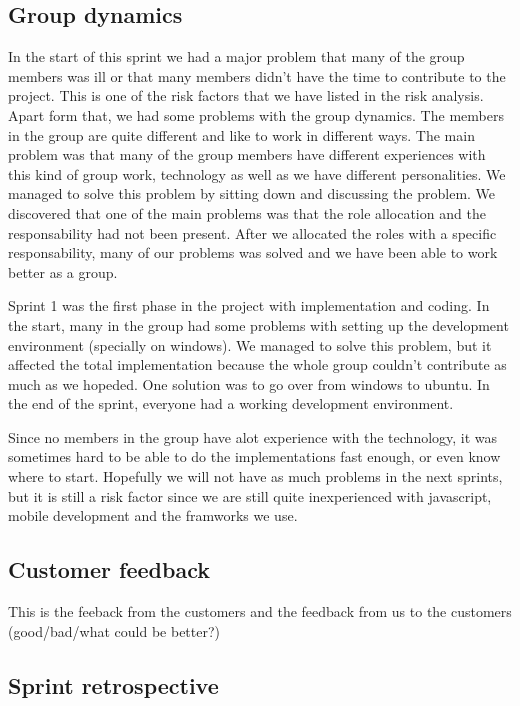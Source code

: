 \subsection{Group dynamics}
In the start of this sprint we had a major problem that many of the group members was ill or 
that many members didn't have the time to contribute to the project. This is one of the risk factors 
that we have listed in the risk analysis. 
Apart form that, we had some problems with the group dynamics. The members in the group are 
quite different and like to work in different ways. The main problem was that many of the group members
have different experiences with this kind of group work, technology as well as we have 
different personalities.
We managed to solve this problem by sitting down and discussing the problem. We discovered that
one of the main problems was that the role allocation and the responsability had not been present.
After we allocated the roles with a specific responsability, many of our problems was solved and
we have been able to work better as a group.

Sprint 1 was the first phase in the project with implementation and coding. In the start, many in the group had
some problems with setting up the development environment (specially on windows). We managed
to solve this problem, but it affected the total implementation because the whole group couldn't 
contribute as much as we hopeded. One solution was to go over from windows to ubuntu. 
In the end of the sprint, everyone had a working development environment.

Since no members in the group have alot experience with the technology, it was sometimes hard
to be able to do the implementations fast enough, or even know where to start. 
Hopefully we will not have as much problems in the next sprints, but it is still a risk factor 
since we are still quite inexperienced with javascript, mobile development and the framworks we use. 

\subsection{Customer feedback}
	This is the feeback from the customers and the feedback from us to the customers (good/bad/what could be better?)

\subsection{Sprint retrospective}
	\subsubsection*{}
	\subsubsection*{}
	\subsubsection*{}
	\subsubsection*{}